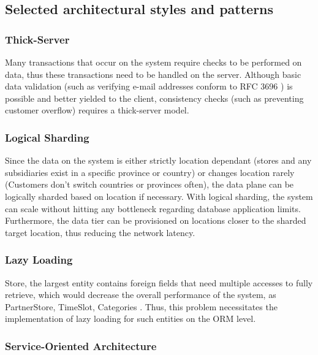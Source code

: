 \subsection{Selected architectural styles and patterns} %

\subsubsection{Thick-Server}Many transactions that occur on the system require checks to be performed on data, thus these transactions need to be handled on the server.
Although basic data validation (such as verifying e-mail addresses conform to RFC 3696 \cite{ietfmailformat}) is possible and better yielded to the client, consistency checks (such as preventing customer overflow) requires a thick-server model.
\subsubsection{Logical Sharding}
Since the data on the system is either strictly location dependant (stores and any subsidiaries exist in a specific province or country) or changes location rarely (Customers don't switch countries or provinces often), the data plane can be logically sharded based on location if necessary.
With logical sharding, the system can scale without hitting any bottleneck regarding database application limits.
Furthermore, the data tier can be provisioned on locations closer to the sharded target location, thus reducing the network latency.

\subsubsection{Lazy Loading}
Store, the largest entity contains foreign fields that need multiple accesses to fully retrieve, which would decrease the overall performance of the system, as PartnerStore, TimeSlot, Categories .
Thus, this problem necessitates the implementation of lazy loading for such entities on the ORM level.

\subsubsection{Service-Oriented Architecture}

